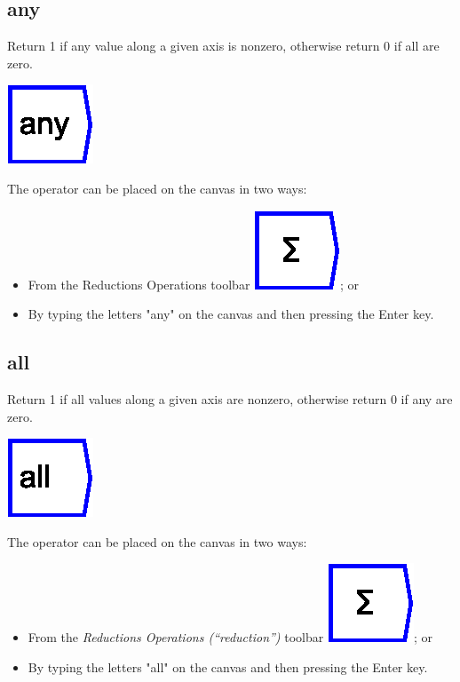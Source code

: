 \subsection{any}

\label{Operation:any} Return 1 if any value along a given axis is
nonzero, otherwise return 0 if all are zero.

\includegraphics{images/any}

The operator can be placed on the canvas in two ways:
\begin{itemize}
\item From the Reductions Operations toolbar \includegraphics{images/sum};
or 
\item By typing the letters "any" on the canvas and then pressing the
Enter key.
\end{itemize}

\subsection{all}

\label{Operation:all} Return 1 if all values along a given axis are
nonzero, otherwise return 0 if any are zero.

\includegraphics{images/all}

The operator can be placed on the canvas in two ways:
\begin{itemize}
\item From the \emph{Reductions Operations (``reduction'')} toolbar \includegraphics{images/sum};
or 
\item By typing the letters "all" on the canvas and then pressing the
Enter key.
\end{itemize}


